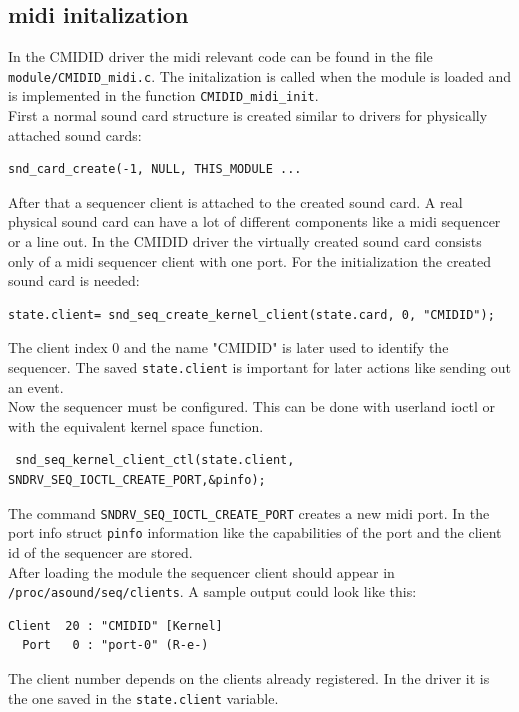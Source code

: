 \documentclass[paper=a4,fontsize=11pt,twocolumn,pagesize,bibtotoc]{scrartcl}
\begin{document}
\subsection{midi initalization}
In the CMIDID driver the midi relevant code can be found in the file \texttt{module/CMIDID\_midi.c}. The initalization is called when the module is loaded and is implemented in the function \texttt{CMIDID\_midi\_init}.\\
First a normal sound card structure is created similar to drivers for physically attached sound cards: \begin{lstlisting}
snd_card_create(-1, NULL, THIS_MODULE ...
\end{lstlisting}
After that a sequencer client is attached to the created sound card. A real physical sound card can have a lot of different components like a midi sequencer or a line out. In the CMIDID driver the virtually created sound card consists only of a midi sequencer client with one port. For the initialization the created sound card is needed:
\begin{lstlisting}
state.client= snd_seq_create_kernel_client(state.card, 0, "CMIDID");
\end{lstlisting}
The client index 0 and the name "CMIDID" is later used to identify the sequencer. The saved \texttt{state.client} is important for later actions like sending out an event.\\ 
Now the sequencer must be configured. This can be done with userland ioctl or with the equivalent kernel space function.
\begin{lstlisting}
 snd_seq_kernel_client_ctl(state.client, SNDRV_SEQ_IOCTL_CREATE_PORT,&pinfo);
\end{lstlisting}
The command \texttt{SNDRV\_SEQ\_IOCTL\_CREATE\_PORT} creates a new midi port. In the port info struct \texttt{pinfo} information like the  capabilities of the port and the client id of the sequencer are stored.
\\
After loading the module the sequencer client should appear in \texttt{/proc/asound/seq/clients}. A sample output could look like this:
\begin{lstlisting}
Client  20 : "CMIDID" [Kernel]
  Port   0 : "port-0" (R-e-)
\end{lstlisting}
The client number depends on the clients already registered. In the driver it is the one saved in the \texttt{state.client} variable.
\end{document}
